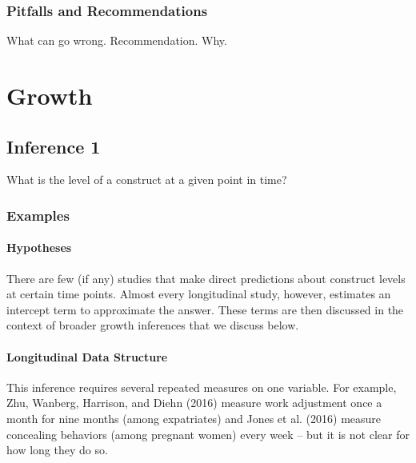\documentclass[english,,man]{apa6}
\let\oldparagraph\paragraph
\renewcommand{\paragraph}[1]{\oldparagraph{#1}\mbox{}}
\theoremstyle{definition}
\theoremstyle{definition}
\theoremstyle{definition}
\theoremstyle{remark}
\begin{document}
\hypertarget{pitfalls-and-recommendations}{%
\subsubsection{Pitfalls and
Recommendations}\label{pitfalls-and-recommendations}}

What can go wrong. Recommendation. Why.

\hypertarget{growth}{%
\section{Growth}\label{growth}}

\hypertarget{inference-1}{%
\subsection{Inference 1}\label{inference-1}}

What is the level of a construct at a given point in time?

\hypertarget{examples}{%
\subsubsection{Examples}\label{examples}}

\hypertarget{hypotheses-1}{%
\paragraph{Hypotheses}\label{hypotheses-1}}

There are few (if any) studies that make direct predictions about
construct levels at certain time points. Almost every longitudinal
study, however, estimates an intercept term to approximate the answer.
These terms are then discussed in the context of broader growth
inferences that we discuss below.

\hypertarget{longitudinal-data-structure-1}{%
\paragraph{Longitudinal Data
Structure}\label{longitudinal-data-structure-1}}

This inference requires several repeated measures on one variable. For
example, Zhu, Wanberg, Harrison, and Diehn (2016) measure work
adjustment once a month for nine months (among expatriates) and Jones et
al. (2016) measure concealing behaviors (among pregnant women) every
week -- but it is not clear for how long they do so.
\end{document}
